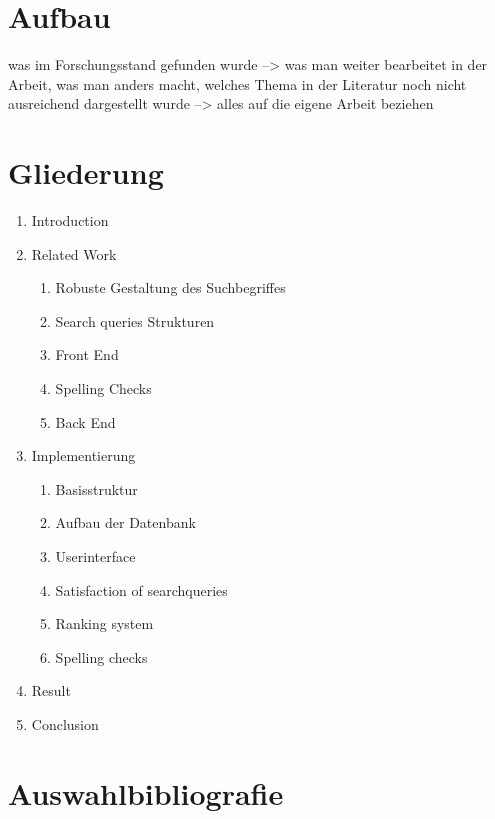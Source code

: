 \documentclass[
a4paper,     %
12pt         %
]{scrartcl}  %
\begin{document}

\section{Aufbau}

was im Forschungsstand gefunden wurde --> was man weiter bearbeitet in der Arbeit, was man anders macht, welches Thema in der Literatur noch nicht ausreichend dargestellt wurde --> alles auf die eigene
Arbeit beziehen 

\section{Gliederung}

\begin{enumerate}
 \item Introduction
 \item Related Work
 \begin{enumerate}
  \item Robuste Gestaltung des Suchbegriffes
  \item Search queries Strukturen
  \item Front End
  \item Spelling Checks
  \item Back End
 \end{enumerate}
 \item Implementierung
 \begin{enumerate}
  \item Basisstruktur
  \item Aufbau der Datenbank
  \item Userinterface
  \item Satisfaction of searchqueries
  \item Ranking system
  \item Spelling checks
 \end{enumerate}
 \item Result
 \item Conclusion
\end{enumerate}

\section{Auswahlbibliografie}
\end{document}
